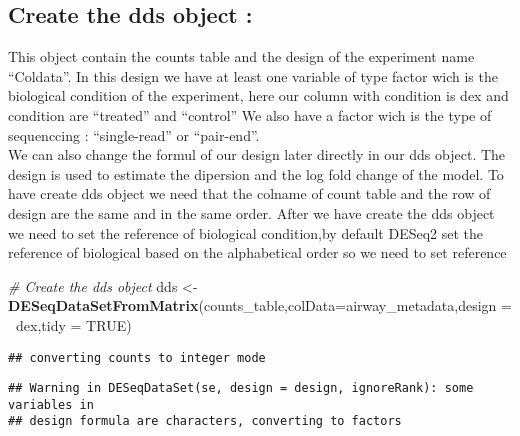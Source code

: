 \documentclass[]{article}
\newenvironment{Shaded}{\begin{snugshade}}{\end{snugshade}}
\newcommand{\KeywordTok}[1]{\textcolor[rgb]{0.13,0.29,0.53}{\textbf{#1}}}
\newcommand{\DataTypeTok}[1]{\textcolor[rgb]{0.13,0.29,0.53}{#1}}
\newcommand{\StringTok}[1]{\textcolor[rgb]{0.31,0.60,0.02}{#1}}
\newcommand{\CommentTok}[1]{\textcolor[rgb]{0.56,0.35,0.01}{\textit{#1}}}
\newcommand{\OtherTok}[1]{\textcolor[rgb]{0.56,0.35,0.01}{#1}}
\newcommand{\OperatorTok}[1]{\textcolor[rgb]{0.81,0.36,0.00}{\textbf{#1}}}
\newcommand{\NormalTok}[1]{#1}
\begin{document}
\subsection{Create the dds object :}\label{create-the-dds-object}

This object contain the counts table and the design of the experiment
name ``Coldata''. In this design we have at least one variable of type
factor wich is the biological condition of the experiment, here our
column with condition is dex and condition are ``treated'' and
``control'' We also have a factor wich is the type of sequenccing :
``single-read'' or ``pair-end''.\\
We can also change the formul of our design later directly in our dds
object. The design is used to estimate the dipersion and the log fold
change of the model. To have create dds object we need that the colname
of count table and the row of design are the same and in the same order.
After we have create the dds object we need to set the reference of
biological condition,by default DESeq2 set the reference of biological
based on the alphabetical order so we need to set reference

\begin{Shaded}
\begin{Highlighting}[]
\CommentTok{# Create the dds object}
\NormalTok{dds <-}\StringTok{ }\KeywordTok{DESeqDataSetFromMatrix}\NormalTok{(counts_table,}\DataTypeTok{colData=}\NormalTok{airway_metadata,}\DataTypeTok{design =} \OperatorTok{~}\NormalTok{dex,}\DataTypeTok{tidy =} \OtherTok{TRUE}\NormalTok{)}
\end{Highlighting}
\end{Shaded}

\begin{verbatim}
## converting counts to integer mode
\end{verbatim}

\begin{verbatim}
## Warning in DESeqDataSet(se, design = design, ignoreRank): some variables in
## design formula are characters, converting to factors
\end{verbatim}

\begin{Shaded}
\end{Shaded}
\end{document}
